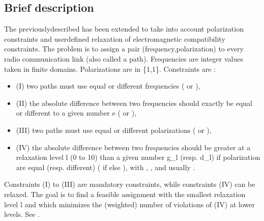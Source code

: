 \documentclass[letterpaper,10pt,openany,oneside,english]{sphinxmanual}
\begin{document}
\subsection{Brief description}
\label{\detokenize{examples/tuto_fapwp:brief-description}}
\sphinxAtStartPar
The previously\sphinxhyphen{}described {\hyperref[\detokenize{examples/tuto_rlfap:tuto-rlfap}]{}} has been extended to take into account polarization constraints and user\sphinxhyphen{}defined relaxation of electromagnetic compatibility constraints. The problem is to assign a pair (frequency,polarization) to every radio communication link (also called a path). Frequencies are integer values taken in finite domains. Polarizations are in \{\sphinxhyphen{}1,1\}. Constraints are :
\begin{itemize}
\item {} 
\sphinxAtStartPar
(I) two paths must use equal or different frequencies ( or ),

\item {} 
\sphinxAtStartPar
(II) the absolute difference between two frequencies should exactly be equal or different to a given number e ( or ),

\item {} 
\sphinxAtStartPar
(III) two paths must use equal or different polarizations ( or ),

\item {} 
\sphinxAtStartPar
(IV) the absolute difference between two frequencies should be greater at a relaxation level l (0 to 10) than a given number g\_l (resp. d\_l) if polarization are equal (resp. different)  ( if  else ), with , , and usually .

\end{itemize}

\sphinxAtStartPar
Constraints (I) to (III) are mandatory constraints, while constraints (IV) can be relaxed. The goal is to find a feasible assignment with the smallest relaxation level l and which minimizes the (weighted) number of violations of (IV) at lower levels. See  .
\end{document}
